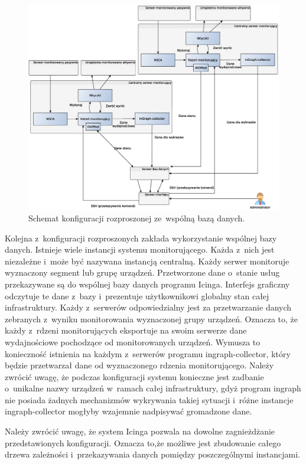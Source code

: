 \begin{figure}[htpb]
\centering
  \caption{Schemat konfiguracji rozproszonej ze~wspólną bazą danych.}
  \label{fig:rozpFull}
\includegraphics[width=1\textwidth]{img/icingaFull}
\end{figure}

Kolejna z~konfiguracji rozproszonych zakłada wykorzystanie wspólnej
bazy danych. Istnieje wiele instancji systemu monitorującego. Każda
z~nich jest niezależne i~może być nazywana instancją centralną. Każdy
serwer monitoruje wyznaczony segment lub grupę urządzeń. Przetworzone
dane o~stanie usług przekazywane są do wspólnej bazy danych programu
Icinga. Interfejs graficzny odczytuje te dane z~bazy i~prezentuje
użytkownikowi globalny stan całej infrastruktury. Każdy z~serwerów
odpowiedzialny jest za przetwarzanie danych zebranych z~wyniku
monitorowania wyznaczonej grupy urządzeń. Oznacza to, że każdy
z~rdzeni monitorujących eksportuje na swoim serwerze dane
wydajnościowe pochodzące od monitorowanych urządzeń. Wymusza to
konieczność istnienia na każdym z~serwerów programu ingraph-collector,
który będzie przetwarzał dane od wyznaczonego rdzenia
monitorującego. Należy zwrócić uwagę, że podczas konfiguracji systemu
konieczne jest zadbanie o~unikalne nazwy urządzeń w~ramach całej
infrastruktury, gdyż program ingraph nie posiada żadnych mechanizmów
wykrywania takiej sytuacji i~różne instancje ingraph-collector mogłyby
wzajemnie nadpisywać gromadzone dane.

Należy zwrócić uwagę, że system Icinga pozwala na dowolne
zagnieżdżanie przedstawionych konfiguracji. Oznacza to,że możliwe jest
zbudowanie całego drzewa zależności i~przekazywania danych pomiędzy
poszczególnymi instancjami.

